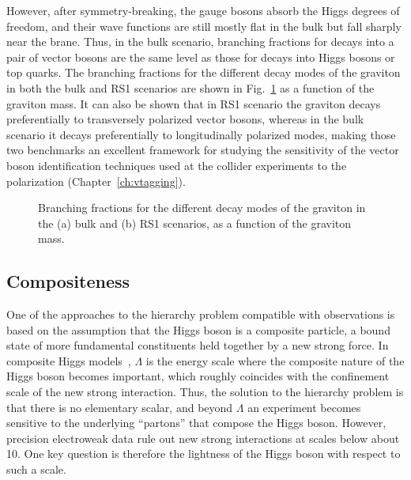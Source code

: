 However, after symmetry-breaking, the gauge bosons absorb the Higgs degrees of freedom, and their wave functions are still mostly flat in the bulk but fall sharply near the brane.
Thus, in the bulk scenario, branching fractions for decays into a pair of vector bosons are the same level as those for decays into Higgs bosons or top quarks.
The branching fractions for the different decay modes of the graviton in both the bulk and RS1 scenarios are shown in Fig.~\ref{fig:GrBR} as a function of the graviton mass.
It can also be shown that in RS1 scenario the graviton decays preferentially to transversely polarized vector bosons, whereas in the bulk scenario it decays preferentially to longitudinally polarized modes, making those two benchmarks an excellent framework for studying the sensitivity of the vector boson identification techniques used at the collider experiments to the polarization (Chapter~\ref{ch:vtagging}).

\begin{figure}[!htb]
\centering
{}
\caption{Branching fractions for the different decay modes of the graviton in the (a) bulk and (b) RS1 scenarios, as a function of the graviton mass.}
\label{fig:GrBR}
\end{figure}

\subsection{Compositeness}\label{subsec:composite}

One of the approaches to the hierarchy problem compatible with observations is based on the assumption that the Higgs boson is a composite particle, a bound state of more fundamental constituents held together by a new strong force.
In composite Higgs models~\cite{Composite0,Composite1,Composite2}, $\Lambda$ is the energy scale where the composite nature of the Higgs boson becomes important, which roughly coincides with the confinement scale of the new strong interaction. Thus, the solution to the hierarchy problem is that there is no elementary scalar, and beyond $\Lambda$ an experiment becomes sensitive to the underlying ``partons'' that compose the Higgs boson. 
However, precision electroweak data rule out new strong interactions at scales below about 10\TeV.
One key question is therefore the lightness of the Higgs boson with respect to such a scale.

